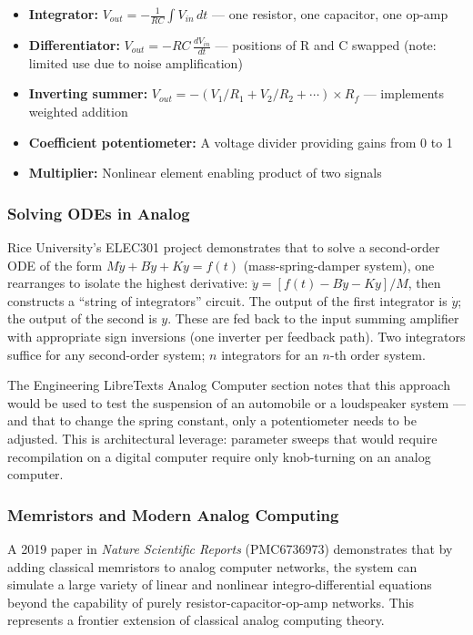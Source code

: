 \documentclass[11pt,letterpaper]{article}
\begin{document}
\begin{itemize}[leftmargin=2em]
  \item \textbf{Integrator:} $V_{out} = -\frac{1}{RC}\int V_{in}\,dt$ --- one resistor, one capacitor, one op-amp
  \item \textbf{Differentiator:} $V_{out} = -RC\,\frac{dV_{in}}{dt}$ --- positions of R and C swapped (note: limited use due to noise amplification)
  \item \textbf{Inverting summer:} $V_{out} = -(V_1/R_1 + V_2/R_2 + \cdots) \times R_f$ --- implements weighted addition
  \item \textbf{Coefficient potentiometer:} A voltage divider providing gains from 0 to 1
  \item \textbf{Multiplier:} Nonlinear element enabling product of two signals
\end{itemize}

\subsubsection{Solving ODEs in Analog}

Rice University's ELEC301 project demonstrates that to solve a second-order ODE of the form $M\ddot{y} + B\dot{y} + Ky = f(t)$ (mass-spring-damper system), one rearranges to isolate the highest derivative: $\ddot{y} = [f(t) - B\dot{y} - Ky]/M$, then constructs a ``string of integrators'' circuit. The output of the first integrator is $\dot{y}$; the output of the second is $y$. These are fed back to the input summing amplifier with appropriate sign inversions (one inverter per feedback path). Two integrators suffice for any second-order system; $n$ integrators for an $n$-th order system.

The Engineering LibreTexts Analog Computer section notes that this approach would be used to test the suspension of an automobile or a loudspeaker system --- and that to change the spring constant, only a potentiometer needs to be adjusted. This is architectural leverage: parameter sweeps that would require recompilation on a digital computer require only knob-turning on an analog computer.

\subsubsection{Memristors and Modern Analog Computing}

A 2019 paper in \textit{Nature Scientific Reports} (PMC6736973) demonstrates that by adding classical memristors to analog computer networks, the system can simulate a large variety of linear and nonlinear integro-differential equations beyond the capability of purely resistor-capacitor-op-amp networks. This represents a frontier extension of classical analog computing theory.
\end{document}

